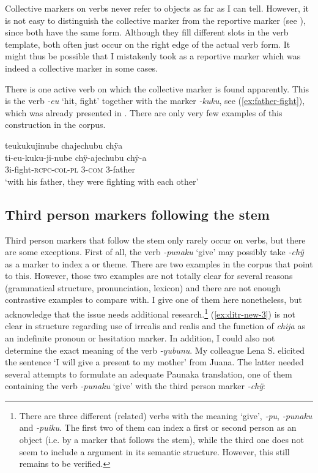 Collective markers on verbs never refer to objects as far as I can tell. However, it is not easy to distinguish the collective marker from the reportive marker (see ), since both have the same form. Although they fill different slots in the verb template, both often just occur on the right edge of the actual verb form. It might thus be possible that I mistakenly took as a reportive marker which was indeed a collective marker in some cases.

There is one active verb on which the collective marker is found apparently. This is the verb \textit{-eu} ‘hit, fight’ together with the  marker \textit{-kuku}, see (\ref{ex:father-fight}), which was already presented in . There are only very few examples of this construction in the corpus.

\ea\label{ex:father-fight}
\begingl
\glpreamble teukukujinube chajechubu chÿa\\
\gla ti-eu-kuku-ji-nube chÿ-ajechubu chÿ-a\\
\glb 3i-fight-\textsc{rcpc}-\textsc{col}-\textsc{pl} 3-\textsc{com} 3-father\\
\glft ‘with his father, they were fighting with each other’
\endgl
\trailingcitation{[rxx-e141230s.195]}
\xe
{}

\subsection{Third person markers following the stem}\label{sec:3_suffixes}

Third person markers that follow the stem only rarely occur on verbs, but there are some exceptions. 
First of all, the  verb \textit{-punaku} ‘give’ may possibly take \textit{-chÿ} as a marker to index a  or theme. There are two examples in the corpus that point to this. However, those two examples are not totally clear for several reasons (grammatical structure, pronunciation, lexicon) and there are not enough contrastive examples to compare with. I give one of them here nonetheless, but acknowledge that the issue needs additional research.\footnote{There are three different (related) verbs with the meaning ‘give’, \textit{-pu}, \textit{-punaku} and \textit{-puiku}. The first two of them can index a first or second person  as an object (i.e. by a marker that follows the stem), while the third one does not seem to include a  argument in its semantic structure. However, this still remains to be verified.} (\ref{ex:ditr-new-3}) is not clear in structure regarding use of irrealis and realis and the function of \textit{chija} as an indefinite pronoun or hesitation marker. In addition, I could also not determine the exact meaning of the verb \textit{-yubunu}. My colleague Lena S. elicited the sentence ‘I will give a present to my mother’ from Juana. The latter needed several attempts to formulate an adequate Paunaka translation, one of them containing the verb \textit{-punaku} ‘give’ with the third person marker \textit{-chÿ}:

